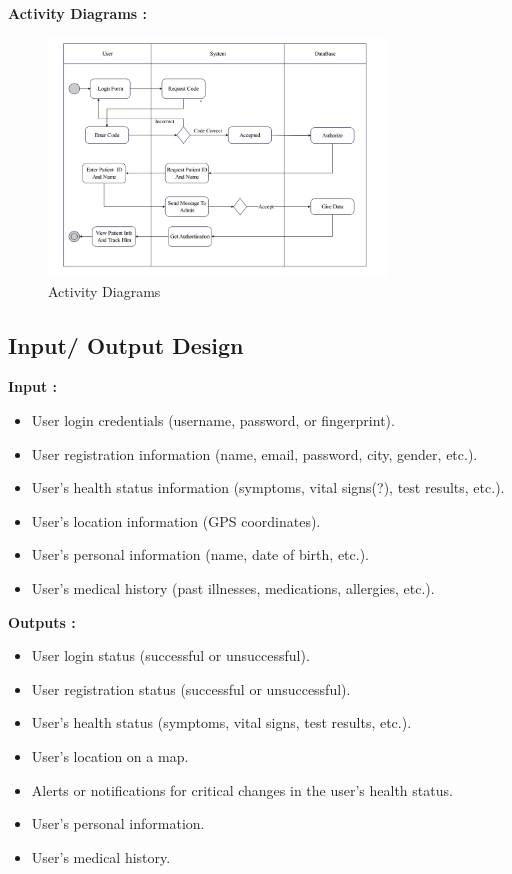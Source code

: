 \documentclass[12pt]{article}
\begin{document}
			\textbf{Activity Diagrams :}
			\begin{figure}[!h]
				\centering
				\includegraphics[width=0.8\textwidth]{Activity.png}
				\caption{Activity Diagrams}
				\label{Activity Diagrams}
			\end{figure}
			\subsection{Input/ Output Design}
			\textbf{Input :}
			\begin{itemize}
				\item User login credentials (username, password, or fingerprint).
				\item User registration information (name, email, password, city, gender, etc.).
				\item User's health status information (symptoms, vital signs(?), test results, etc.).
				\item User's location information (GPS coordinates).
				\item User's personal information (name, date of birth, etc.).
				\item User's medical history (past illnesses, medications, allergies, etc.).
				
			\end{itemize}
			\textbf{Outputs :}
			\begin{itemize}
				\item User login status (successful or unsuccessful).
				\item User registration status (successful or unsuccessful).
				\item User's health status (symptoms, vital signs, test results, etc.).
				\item User's location on a map.
				\item Alerts or notifications for critical changes in the user's health status.
				\item User's personal information.
				\item User's medical history.
				
			\end{itemize}
\end{document}
